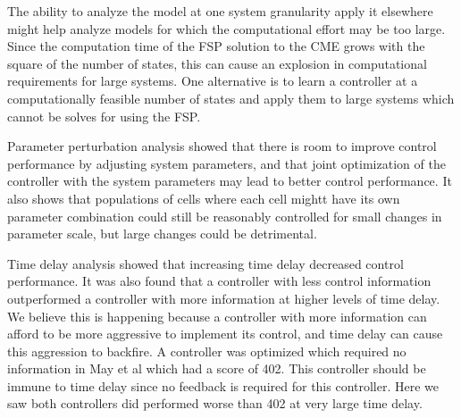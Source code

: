 \documentclass[12pt]{article}
\begin{document}
The ability to analyze the model at one system granularity apply it elsewhere might help analyze models for which the computational effort may be too large. Since the computation time of the FSP solution to the CME grows with the square of the number of states, this can cause an explosion in computational requirements for large systems. One alternative is to learn a controller at a computationally feasible number of states and apply them to large systems which cannot be solves for using the FSP. 

Parameter perturbation analysis showed that there is room to improve control performance by adjusting system parameters, and that joint optimization of the controller with the system parameters may lead to better control performance. It also shows that populations of cells where each cell mightt have its own parameter combination could still be reasonably controlled for small changes in parameter scale, but large changes could be detrimental.

Time delay analysis showed that increasing time delay decreased control performance. It was also found that a controller with less control information outperformed a controller with more information at higher levels of time delay. We believe this is happening because a controller with more information can afford to be more aggressive to implement its control, and time delay can cause this aggression to backfire. A controller was optimized which required no information in May et al which had a score of 402. This controller should be immune to time delay since no feedback is required for this controller. Here we saw both controllers did performed worse than 402 at very large time delay.
\end{document}
